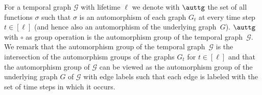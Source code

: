 For a temporal graph $\mathcal{G}$ with lifetime $\ell$ we denote with $\auttg$
the set of all functions $\sigma$ such that $\sigma$ is an automorphism of each
graph $G_t$ at every time step $t \in [\ell]$ {(and hence also an
automorphism of the underlying graph~$G$). $\auttg$ with $\circ$ as group
operation is the automorphism group of the temporal graph~$\mathcal{G}$.}
%
We remark that the automorphism group of the temporal graph~$\mathcal{G}$
is the intersection of the automorphism groups of the graphs
$G_t$ for $t\in[\ell]$ and that the automorphism group of
$\mathcal{G}$ can be viewed as the automorphism group of the underlying graph
$G$ of $\mathcal{G}$ with edge labels such that each edge is labeled with the set
of time steps in which it occurs.

